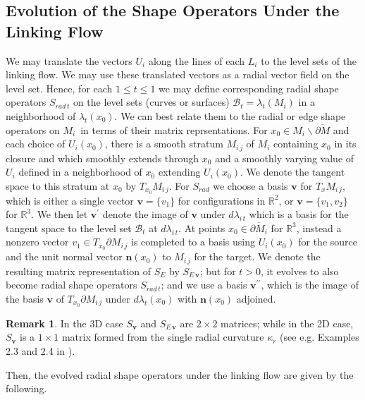 \documentclass[10pt]{amsart}
\theoremstyle{definition}
\theoremstyle{definition}
\newtheorem{Remark}[Thm]{Remark}
\numberwithin{equation}{section}
\newcommand{\R}{{\mathbb R}}
\newcommand{\bdyM}{\partial M}
\def \bn {\mathbf {n}}
\def \bv {\mathbf {v}}
\def \cB {\mathcal{B}}
\def \gk {\kappa}
\def \gl {\lambda}
\begin{document}
\subsection*{Evolution of the Shape Operators Under the Linking Flow} 
\par
We may translate the vectors $U_i$ along the lines of each $L_i$ to the 
level sets of the linking flow.  We may use these translated vectors as a 
radial vector field on the level set.  Hence, for each $1 \leq t \leq 1$ we 
may define corresponding radial shape operators $S_{rad\, t}$ on the level 
sets (curves or surfaces) $\cB_t = \gl_t(M_i)$ in a neighborhood of 
$\gl_t(x_0)$.  We can best relate them to the radial or edge shape 
operators on $M_i$\, in terms of their matrix reprsentations.  For $x_0 \in 
M_i \backslash \overline{\bdyM}$ and each choice of $U_i(x_0)$, there is a 
smooth stratum $M_{i\, j}$ of $M_i$ containing $x_0$ in its closure and 
which smoothly extends through $x_0$ and a smoothly varying value of 
$U_i$ defined in a neighborhood of $x_0$ extending $U_i(x_0)$.  We denote 
the tangent space to this stratum at $x_0$ by $T_{x_0}M_{i\, j}$.  For 
$S_{rad}$ we choose a basis $\bv$ for $T_xM_{i\, j}$, which is either a 
single vector $\bv = \{v_1\}$ for configurations in $\R^2$, or $\bv = 
\{v_1, v_2\}$ for $\R^3$.  We then let $\bv^{\prime}$ denote the image of 
$\bv$ under $d\gl_{i\, t}$ which is a basis for the tangent space to the 
level set $\cB_t$ at $d\gl_{i\, t}$.  At points $x_0 \in 
\overline{\bdyM_i}$ for $\R^3$, instead a nonzero vector $v_1 \in T_{x_0} 
\partial M_{i\, j}$ is completed to a basis using $U_i(x_0)$ for the source 
and the unit normal vector $\bn(x_0)$ to $M_{i\, j}$ for the target.  We 
denote the resulting matrix representation of $S_{E}$ by $S_{E\, \bv}$; 
but for $t > 0$, it evolves to also become radial shape operators $S_{rad\, 
t}$; and we use a basis $\bv^{\prime\prime}$, which is the image of the 
basis $\bv$ of $T_{x_0}\partial M_{i\, j}$ under $d\gl_t(x_0)$ with 
$\bn(x_0)$ adjoined.  
\par
\begin{Remark}
\label{Rem2.1}
\normalfont
In the 3D case $S_{\bv}$ and $S_{E\, \bv}$ are $2 \times 2$ matrices; 
while in the 2D case, $S_{\bv}$ is a $1 \times 1$ matrix formed from the 
single radial curvature $\gk_r$ (see e.g. Examples 2.3 and 2.4 in 
\cite{D3}).  
\end{Remark}
\par
Then, the evolved radial shape operators under the linking flow are given 
by the following.  
\end{document}
